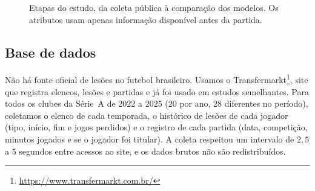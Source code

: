 \documentclass[conference]{IEEEtran}
\begin{document}
\begin{figure}[!t]
\centering
{}
\caption{Etapas do estudo, da coleta pública à comparação dos modelos. Os atributos usam apenas informação disponível antes da partida.}
\label{fig:fluxo}
\end{figure}

\subsection{Base de dados}

Não há fonte oficial de lesões no futebol brasileiro. Usamos o Transfermarkt\footnote{\url{https://www.transfermarkt.com.br/}}, site que registra elencos, lesões e partidas e já foi usado em estudos semelhantes. Para todos os clubes da Série~A de 2022 a 2025 (20 por ano, 28 diferentes no período), coletamos o elenco de cada temporada, o histórico de lesões de cada jogador (tipo, início, fim e jogos perdidos) e o registro de cada partida (data, competição, minutos jogados e se o jogador foi titular). A coleta respeitou um intervalo de $2{,}5$ a $5$ segundos entre acessos ao site, e os dados brutos não são redistribuídos.
\end{document}

